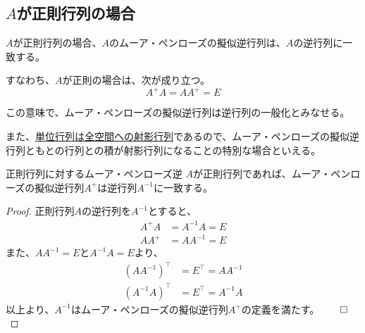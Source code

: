 \documentclass[../../../topic_linear-algebra]{subfiles}
\begin{document}
\subsection{$A$が正則行列の場合}

$A$が正則行列の場合、$A$のムーア・ペンローズの擬似逆行列は、$A$の逆行列に一致する。

すなわち、$A$が正則の場合は、次が成り立つ。
\begin{equation*}
  A^+ A = A A^+ = E
\end{equation*}

この意味で、ムーア・ペンローズの擬似逆行列は逆行列の一般化とみなせる。

\br

また、\hyperref[sec:identity-to-projections]{単位行列は全空間への射影行列}であるので、ムーア・ペンローズの擬似逆行列ともとの行列との積が射影行列になることの特別な場合といえる。

\begin{theorem}{正則行列に対するムーア・ペンローズ逆}\label{thm:pseudoinverse-of-invertible}
  $A$が正則行列であれば、ムーア・ペンローズの擬似逆行列$A^+$は逆行列$A^{-1}$に一致する。
\end{theorem}

\begin{proof}
  正則行列$A$の逆行列を$A^{-1}$とすると、
  \begin{align*}
    A^+ A &= A^{-1} A = E \\
    A A^+ &= A A^{-1} = E
  \end{align*}
  また、$AA^{-1} = E$と$A^{-1}A = E$より、
  \begin{align*}
    (AA^{-1})^\top & = E^\top = AA^{-1} \\
    (A^{-1}A)^\top & = E^\top = A^{-1}A
  \end{align*}
  以上より、$A^{-1}$はムーア・ペンローズの擬似逆行列$A^+$の定義を満たす。$\qed$
\end{proof}
\end{document}
